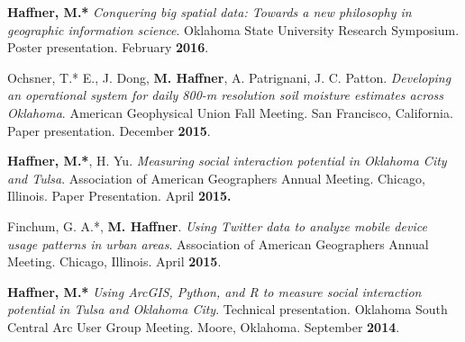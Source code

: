\begin{cventries}
{\begin{cvitems}
          \vspace{-2mm}
            \item {\textbf{Haffner, M.*} \textit{Conquering big spatial data: Towards a new philosophy in geographic information science}. Oklahoma State University Research Symposium. Poster presentation. February \textbf{2016}.}   
              \end{cvitems}
            }
   \cventry
      {}
      {}
      {}
      {}
      {
        \begin{cvitems}
          \vspace{-2mm}
            \item {Ochsner, T.* E., J. Dong, \textbf{M. Haffner}, A. Patrignani, J. C. Patton. \textit{Developing an operational system for daily 800-m resolution soil moisture estimates across Oklahoma}. American Geophysical Union Fall Meeting. San Francisco, California. Paper presentation. December \textbf{2015}.} 
            \end{cvitems}
            }
   \cventry
      {}
      {}
      {}
      {}
      {
        \begin{cvitems}
          \vspace{-2mm}
            \item {\textbf{Haffner, M.*}, H. Yu. \textit{Measuring social interaction potential in Oklahoma City and Tulsa}. Association of American Geographers Annual Meeting. Chicago, Illinois. Paper Presentation. April \textbf{2015.}} 
              \end{cvitems}
              }
   \cventry
      {}
      {}
      {}
      {}
      {
        \begin{cvitems}
          \vspace{-2mm}
            \item {Finchum, G. A.*, \textbf{M. Haffner}. \textit{Using Twitter data to analyze mobile device usage patterns in urban areas}. Association of American Geographers Annual Meeting. Chicago, Illinois. April \textbf{2015}.}  
              \end{cvitems}
            }
   \cventry
      {}
      {}
      {}
      {}
      {
        \begin{cvitems}
          \vspace{-2mm}
            \item {\textbf{Haffner, M.*} \textit{Using ArcGIS, Python, and R to measure social interaction potential in Tulsa and Oklahoma City}. Technical presentation. Oklahoma South Central Arc User Group Meeting. Moore, Oklahoma. September \textbf{2014}.} 

\end{cvitems}}
\end{cventries}
